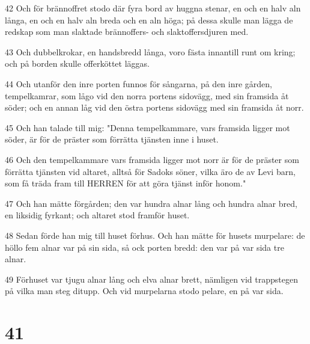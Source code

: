 \par 42 Och för brännoffret stodo där fyra bord av huggna stenar, en och en halv aln långa, en och en halv aln breda och en aln höga; på dessa skulle man lägga de redskap som man slaktade brännoffers- och slaktoffersdjuren med.
\par 43 Och dubbelkrokar, en handsbredd långa, voro fästa innantill runt om kring; och på borden skulle offerköttet läggas.
\par 44 Och utanför den inre porten funnos för sångarna, på den inre gården, tempelkamrar, som lågo vid den norra portens sidovägg, med sin framsida åt söder; och en annan låg vid den östra portens sidovägg med sin framsida åt norr.
\par 45 Och han talade till mig: "Denna tempelkammare, vars framsida ligger mot söder, är för de präster som förrätta tjänsten inne i huset.
\par 46 Och den tempelkammare vars framsida ligger mot norr är för de präster som förrätta tjänsten vid altaret, alltså för Sadoks söner, vilka äro de av Levi barn, som få träda fram till HERREN för att göra tjänst inför honom."
\par 47 Och han mätte förgården; den var hundra alnar lång och hundra alnar bred, en liksidig fyrkant; och altaret stod framför huset.
\par 48 Sedan förde han mig till huset förhus. Och han mätte för husets murpelare: de höllo fem alnar var på sin sida, så ock porten bredd: den var på var sida tre alnar.
\par 49 Förhuset var tjugu alnar lång och elva alnar brett, nämligen vid trappstegen på vilka man steg ditupp. Och vid murpelarna stodo pelare, en på var sida.

\chapter{41}

